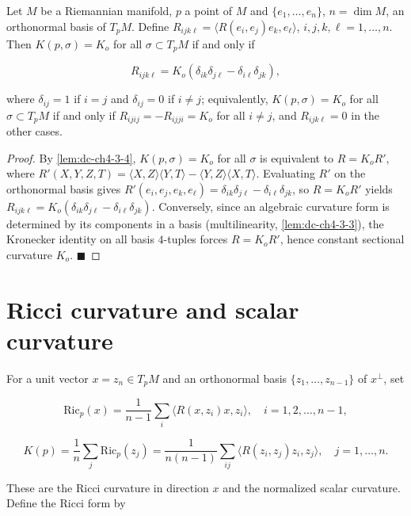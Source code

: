 \begin{corollary}
  \label{cor:dc-ch4-3-5}
  \leanok
  Let $M$ be a Riemannian manifold, $p$ a point of $M$ and $\{e_1,\dots,e_n\}$,
  $n=\dim M$, an orthonormal basis of $T_pM$. Define
  $R_{ijk\ell}=\langle R(e_i,e_j)e_k,e_\ell\rangle$, $i,j,k,\ell=1,\dots,n$. Then
  $K(p,\sigma)=K_o$ for all $\sigma\subset T_pM$ if and only if
  
  $$
  R_{ijk\ell}=K_o(\delta_{ik}\delta_{j\ell}-\delta_{i\ell}\delta_{jk}),
  $$
  
  where $\delta_{ij}=1$ if $i=j$ and $\delta_{ij}=0$ if $i\neq j$; equivalently,
  $K(p,\sigma)=K_o$ for all $\sigma\subset T_pM$ if and only if
  $R_{ijij}=-R_{ijji}=K_o$ for all $i\neq j$, and $R_{ijk\ell}=0$ in the other
  cases.
\end{corollary}
\begin{proof}
  \leanok
  \sketch
  By \cref{lem:dc-ch4-3-4}, $K(p,\sigma)=K_o$ for all $\sigma$ is equivalent to
  $R=K_oR'$, where $R'(X,Y,Z,T)=\langle X,Z\rangle\langle Y,T\rangle-\langle
  Y,Z\rangle\langle X,T\rangle$. Evaluating $R'$ on the orthonormal basis gives
  $R'(e_i,e_j,e_k,e_\ell)=\delta_{ik}\delta_{j\ell}-\delta_{i\ell}\delta_{jk}$,
  so $R=K_oR'$ yields
  $R_{ijk\ell}=K_o(\delta_{ik}\delta_{j\ell}-\delta_{i\ell}\delta_{jk})$.
  Conversely, since an algebraic curvature form is determined by its components
  in a basis (multilinearity, \cref{lem:dc-ch4-3-3}), the Kronecker identity on
  all basis $4$-tuples forces $R=K_oR'$, hence constant sectional curvature
  $K_o$. $\blacksquare$
\end{proof}

\section{Ricci curvature and scalar curvature}

For a unit vector $x=z_n\in T_pM$ and an orthonormal basis
$\{z_1,\dots,z_{n-1}\}$ of $x^\perp$, set

$$
\mathrm{Ric}_p(x)=\frac{1}{n-1}\sum_i\langle R(x,z_i)x,z_i\rangle,\quad i=1,2,\dots,n-1,
$$

$$
K(p)=\frac{1}{n}\sum_j\mathrm{Ric}_p(z_j)=\frac{1}{n(n-1)}\sum_{ij}\langle R(z_i,z_j)z_i,z_j\rangle,\quad j=1,\dots,n.
$$

These are the Ricci curvature in direction $x$ and the normalized scalar
curvature. Define the Ricci form by

